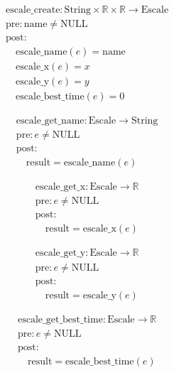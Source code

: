 \[
\begin{aligned}
&\text{escale\_create}: \text{String} \times \mathbb{R} \times \mathbb{R} \to \text{Escale} \\
&\text{pre}: \text{name} \neq \text{NULL} \\
&\text{post}: \\
&\quad \text{escale\_name}(e) = \text{name} \\
&\quad \text{escale\_x}(e) = x \\
&\quad \text{escale\_y}(e) = y \\
&\quad \text{escale\_best\_time}(e) = 0
\end{aligned}
\]





\[
\begin{aligned}
&\text{escale\_get\_name}: \text{Escale} \to \text{String} \\
&\text{pre}: e \neq \text{NULL} \\
&\text{post}: \\
&\quad \text{result} = \text{escale\_name}(e)
\end{aligned}
\]





\[
\begin{aligned}
&\text{escale\_get\_x}: \text{Escale} \to \mathbb{R} \\
&\text{pre}: e \neq \text{NULL} \\
&\text{post}: \\
&\quad \text{result} = \text{escale\_x}(e)
\end{aligned}
\]





\[
\begin{aligned}
&\text{escale\_get\_y}: \text{Escale} \to \mathbb{R} \\
&\text{pre}: e \neq \text{NULL} \\
&\text{post}: \\
&\quad \text{result} = \text{escale\_y}(e)
\end{aligned}
\]





\[
\begin{aligned}
&\text{escale\_get\_best\_time}: \text{Escale} \to \mathbb{R} \\
&\text{pre}: e \neq \text{NULL} \\
&\text{post}: \\
&\quad \text{result} = \text{escale\_best\_time}(e)
\end{aligned}
\]





